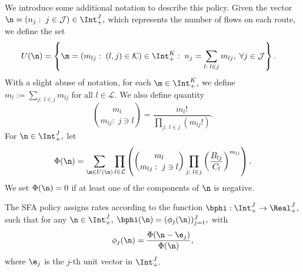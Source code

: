 We introduce some additional notation to describe this policy. Given
the vector $\n=(n_{j}:\;j\in\mathcal{J})\in\Int_{+}^{J},$ which represents
the number of flows on each route, we define the set 
\begin{align*}
U(\n) & =\left\{ \m=(m_{lj}:\;(l,j)\in\mathcal{K})\in\Int_{+}^{K}:\;n_{j}=\sum_{l:\;l\in j}m_{lj},\;\forall j\in\mathcal{J}\right\} .
\end{align*}
With a slight abuse of notation, for each $\m\in\Int_{+}^{K},$ we
define $m_{l}:=\sum_{j:\;l\in j}m_{lj}$ for all $l\in\mathcal{L}.$
We also define quantity
\[
{m_{l} \choose m_{lj}:\;j\ni l}=\frac{m_{l}!}{\prod_{j:\;l\in j}(m_{lj}!)}.
\]
 For $\n\in\Int_{+}^{J},$ let
\[
\Phi(\n)=\sum_{\m\in U(\n)}\prod_{l\in\mathcal{L}}\left({m_{l} \choose m_{lj}:\;j\ni l}\prod_{j:\;l\in j}\left(\frac{B_{lj}}{C_{l}}\right)^{m_{lj}}\right).
\]
 We set $\Phi(\n)=0$ if at least one of the components of $\n$ is
negative. 

The SFA policy assigns rates according to the function $\bphi:\Int_{+}^{J}\rightarrow\Real_{+}^{J},$
such that for any $\n\in\Int_{+}^{J},$ $\bphi(\n)=(\phi_{j}(\n))_{j=1}^{J},$
with 
\[
\phi_{j}(\n) = \frac{\Phi(\n-\e_{j})}{\Phi(\n)},
\]
 where $\e_{j}$ is the $j$-th unit vector in $\Int_{+}^{J}.$

\smallskip

